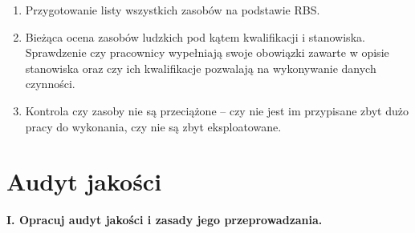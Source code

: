 \begin{enumerate}
\item	Przygotowanie listy wszystkich zasobów na podstawie RBS.
\item	Bieżąca ocena zasobów ludzkich pod kątem kwalifikacji i stanowiska.  Sprawdzenie czy pracownicy wypełniają swoje obowiązki zawarte w opisie stanowiska oraz czy ich kwalifikacje pozwalają na wykonywanie danych czynności.
\item	Kontrola czy zasoby nie są przeciążone – czy nie jest im przypisane zbyt dużo pracy do wykonania, czy nie są zbyt eksploatowane.
\end{enumerate}


\section{Audyt jakości}

\textbf{I. Opracuj audyt jakości i zasady jego przeprowadzania.}

